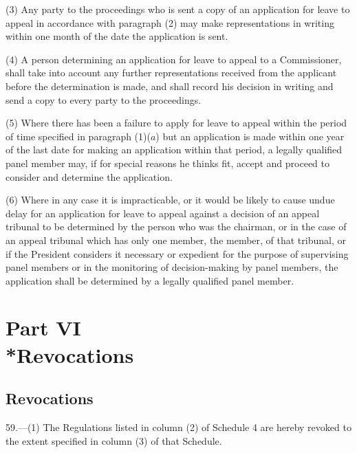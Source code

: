 \documentclass[12pt,a4paper]{article}
\begin{document}
(3) Any party to the proceedings who is sent a copy of an application for leave to appeal in accordance with paragraph (2) may make representations in writing within one month of the date the application is sent.

(4) A person determining an application for leave to appeal to a Commissioner, shall take into account any further representations received from the applicant before the determination is made, and shall record his decision in writing and send a copy to every party to the proceedings.

(5) Where there has been a failure to apply for leave to appeal within the period of time specified in paragraph (1)($a$) but an application is made within one year of the last date for making an application within that period, a legally qualified panel member may, if for special reasons he thinks fit, accept and proceed to consider and determine the application.

(6) Where in any case it is impracticable, or it would be likely to cause undue delay for an application for leave to appeal against a decision of an appeal tribunal to be determined by the person who was the chairman, or in the case of an appeal tribunal which has only one member, the member, of that tribunal, 
or if the President considers it necessary or expedient for the purpose of supervising panel members or in the monitoring of decision-making by panel members,  %
the application shall be determined by a legally qualified panel member.


\section[Part VI --- Revocations]{Part VI\\*Revocations}

\subsection[59. Revocations]{Revocations}

\renewcommand\parthead{--- Part VI}

59.—(1) The Regulations listed in column (2) of Schedule 4 are hereby revoked to the extent specified in column (3) of that Schedule.
\end{document}
